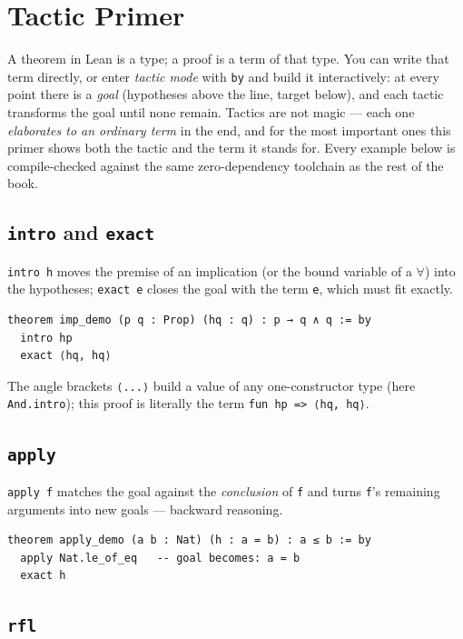 \documentclass[12pt, a4paper, openright]{book}
\theoremstyle{thmstyle}
\theoremstyle{defstyle}
\newcommand{\lc}[1]{\texttt{#1}}
\begin{document}
\section{Tactic Primer}
\label{app:primer}

A theorem in Lean is a type; a proof is a term of that type. You can write
that term directly, or enter \emph{tactic mode} with \lc{by} and build it
interactively: at every point there is a \emph{goal} (hypotheses above the
line, target below), and each tactic transforms the goal until none remain.
Tactics are not magic --- each one \emph{elaborates to an ordinary term} in
the end, and for the most important ones this primer shows both the tactic
and the term it stands for. Every example below is compile-checked against
the same zero-dependency toolchain as the rest of the book.

\subsection*{\lc{intro} and \lc{exact}}

\lc{intro h} moves the premise of an implication (or the bound variable of
a $\forall$) into the hypotheses; \lc{exact e} closes the goal with the
term \lc{e}, which must fit exactly.

\begin{verbatim}
theorem imp_demo (p q : Prop) (hq : q) : p → q ∧ q := by
  intro hp
  exact ⟨hq, hq⟩
\end{verbatim}

The angle brackets \lc{⟨...⟩} build a value of any one-constructor type
(here \lc{And.intro}); this proof is literally the term
\lc{fun hp => ⟨hq, hq⟩}.

\subsection*{\lc{apply}}

\lc{apply f} matches the goal against the \emph{conclusion} of \lc{f} and
turns \lc{f}'s remaining arguments into new goals --- backward reasoning.

\begin{verbatim}
theorem apply_demo (a b : Nat) (h : a = b) : a ≤ b := by
  apply Nat.le_of_eq   -- goal becomes: a = b
  exact h
\end{verbatim}

\subsection*{\lc{rfl}}
\end{document}
